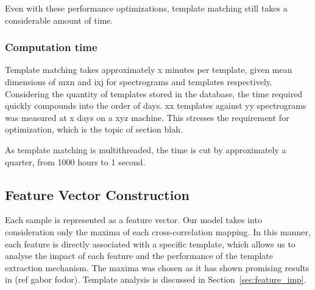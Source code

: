 Even with these performance optimizations, template matching still takes a
considerable amount of time.

\subsubsection{Computation time}
Template matching takes approximately x minutes per template, given
mean dimensions of mxn and ixj for spectrograms and templates respectively.
Considering the quantity of templates stored in the database, the time
required quickly compounds into the order of days.
xx templates against yy spectrograms was measured at x days on a xyz machine.
This stresses the requirement for optimization, which is the topic of
section blah.

As template matching is multithreaded, the time is cut by approximately a
quarter, from 1000 hours to 1 second.


\subsection{Feature Vector Construction}
Each sample is represented as a feature vector.
Our model takes into consideration only the maxima of each cross-correlation
mapping.
In this manner, each feature is directly associated with a specific template,
which allows us to analyse the impact of each feature and the performance of the
template extraction mechanism.
The maxima was chosen as it has shown promising results in (ref gabor fodor).
Template analysis is discussed in Section~\ref{sec:feature_imp}.

